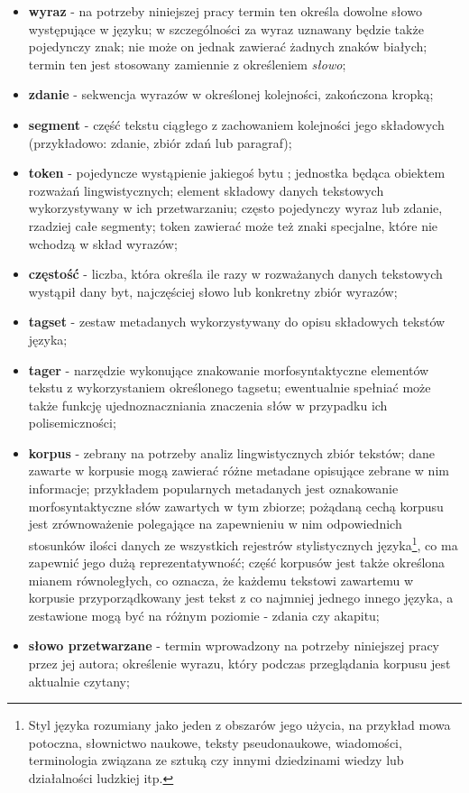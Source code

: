 \begin{itemize}
	\setlength{\itemsep}{1em}
	\item \textbf{wyraz} - na potrzeby niniejszej pracy termin ten określa dowolne słowo występujące w języku; w szczególności za wyraz uznawany będzie także pojedynczy znak; nie może on jednak zawierać żadnych znaków białych; termin ten jest stosowany zamiennie z określeniem \emph{słowo};
	\item \textbf{zdanie} - sekwencja wyrazów w określonej kolejności, zakończona kropką;
	\item \textbf{segment} - część tekstu ciągłego z zachowaniem kolejności jego składowych (przykładowo: zdanie, zbiór zdań lub paragraf);
	\item \textbf{token} - pojedyncze wystąpienie jakiegoś bytu \cite[str. 22]{mit}; jednostka będąca obiektem rozważań lingwistycznych; element składowy danych tekstowych wykorzystywany w ich przetwarzaniu; często pojedynczy wyraz lub zdanie, rzadziej całe segmenty; token zawierać może też znaki specjalne, które nie wchodzą w skład wyrazów;
	\item \textbf{częstość} - liczba, która określa ile razy w rozważanych danych tekstowych wystąpił dany byt, najczęściej słowo lub konkretny zbiór wyrazów;
	\item \textbf{tagset} - zestaw metadanych wykorzystywany do opisu składowych tekstów języka;
	\item \textbf{tager} - narzędzie wykonujące znakowanie morfosyntaktyczne elementów tekstu z wykorzystaniem określonego tagsetu; ewentualnie spełniać może także funkcję ujednoznaczniania znaczenia słów w przypadku ich polisemiczności;
	\item \textbf{korpus} - zebrany na potrzeby analiz lingwistycznych zbiór tekstów; dane zawarte w korpusie mogą zawierać różne metadane opisujące zebrane w nim informacje; przykładem popularnych metadanych jest oznakowanie morfosyntaktyczne słów zawartych w tym zbiorze; pożądaną cechą korpusu jest zrównoważenie polegające na zapewnieniu w nim odpowiednich stosunków ilości danych ze wszystkich rejestrów stylistycznych języka\footnote{Styl języka rozumiany jako jeden z obszarów jego użycia, na przykład mowa potoczna, słownictwo naukowe, teksty pseudonaukowe, wiadomości, terminologia związana ze sztuką czy innymi dziedzinami wiedzy lub działalności ludzkiej itp.}, co ma zapewnić jego dużą reprezentatywność; część korpusów jest także określona mianem równoległych, co oznacza, że każdemu tekstowi zawartemu w korpusie przyporządkowany jest tekst z co najmniej jednego innego języka, a zestawione mogą być na różnym poziomie - zdania czy akapitu;
	\item \textbf{słowo przetwarzane} - termin wprowadzony na potrzeby niniejszej pracy przez jej autora; określenie wyrazu, który podczas przeglądania korpusu jest aktualnie czytany;
\end{itemize}  
